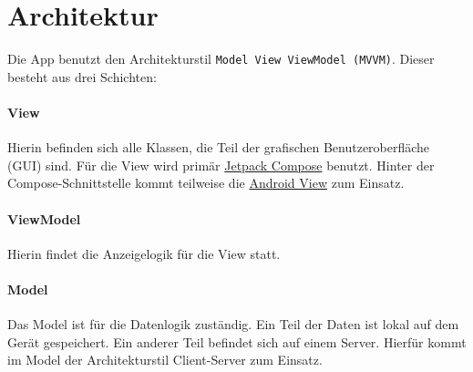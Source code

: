 \section{Architektur}
Die App benutzt den Architekturstil \texttt{Model View ViewModel (MVVM)}. Dieser besteht aus drei Schichten:

\paragraph*{View}
Hierin befinden sich alle Klassen, die Teil der grafischen Benutzeroberfläche (GUI) sind. 
Für die View wird primär \href{https://developer.android.com/jetpack/compose}{Jetpack Compose} benutzt. 
Hinter der Compose-Schnittstelle kommt teilweise die \href{https://developer.android.com/reference/android/view/View}{Android View} zum Einsatz.

\paragraph*{ViewModel}
Hierin findet die Anzeigelogik für die View statt.

\paragraph*{Model}
Das Model ist für die Datenlogik zuständig. Ein Teil der Daten ist lokal auf dem Gerät gespeichert. 
Ein anderer Teil befindet sich auf einem Server. Hierfür kommt im Model der Architekturstil Client-Server zum Einsatz.